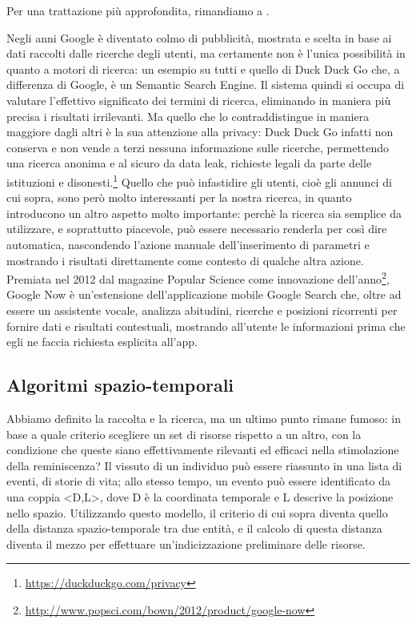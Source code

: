 \documentclass[sigproc-sp.tex]{subfiles}
\begin{document}
Per una trattazione più approfondita, rimandiamo a \cite{brin1998anatomy}.

Negli anni Google è diventato colmo di pubblicità, mostrata e scelta in base ai dati raccolti dalle ricerche degli utenti, ma certamente non è l’unica possibilità in quanto a motori di ricerca: un esempio su tutti e quello di Duck Duck Go che, a differenza di Google, è un Semantic Search Engine. Il sistema quindi si occupa di valutare l’effettivo significato dei termini di ricerca, eliminando in maniera più precisa i risultati irrilevanti. Ma quello che lo contraddistingue in maniera maggiore dagli altri è la sua attenzione alla privacy: Duck Duck Go infatti non conserva e non vende a terzi nessuna informazione sulle ricerche, permettendo una ricerca anonima e al sicuro da data leak, richieste legali da parte delle istituzioni e disonesti.\footnote{\url{https://duckduckgo.com/privacy}}
Quello che può infastidire gli utenti, cioè gli annunci di cui sopra, sono però molto interessanti per la nostra ricerca, in quanto introducono un altro aspetto molto importante: perchè la ricerca sia semplice da utilizzare, e soprattutto piacevole, può essere necessario renderla per così dire automatica, nascondendo l’azione manuale dell’inserimento di parametri e mostrando i risultati direttamente come contesto di qualche altra azione. Premiata nel 2012 dal magazine Popular Science come innovazione dell’anno\footnote{\url{http://www.popsci.com/bown/2012/product/google-now}}, Google Now è un’estensione dell’applicazione mobile Google Search che, oltre ad essere un assistente vocale, analizza abitudini, ricerche e posizioni ricorrenti per fornire dati e risultati contestuali, mostrando all’utente le informazioni prima che egli ne faccia richiesta esplicita all’app.

\subsection{Algoritmi spazio-temporali}
Abbiamo definito la raccolta e la ricerca, ma un ultimo punto rimane fumoso: in base a quale criterio scegliere un set di risorse rispetto a un altro, con la condizione che queste siano effettivamente rilevanti ed efficaci nella stimolazione della reminiscenza? Il vissuto di un individuo può essere riassunto in una lista di eventi, di storie di vita; allo stesso tempo, un evento può essere identificato da una coppia <D,L>, dove D è la coordinata temporale e L descrive la posizione nello spazio. Utilizzando questo modello, il criterio di cui sopra diventa quello della distanza spazio-temporale tra due entità, e il calcolo di questa distanza diventa il mezzo per effettuare un’indicizzazione preliminare delle risorse.
\end{document}

